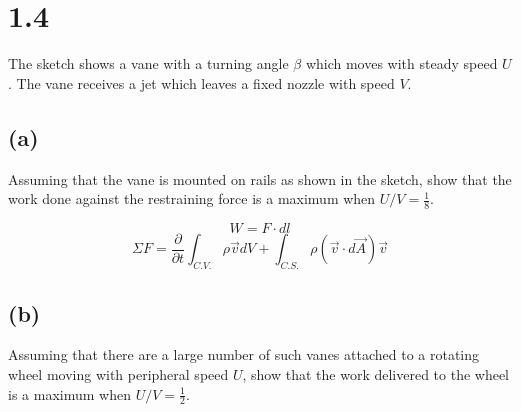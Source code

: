 \documentclass[preview,12pt]{article}
\begin{document}
\section*{1.4}
    The sketch shows a vane with a turning angle $\beta$ which moves with steady speed $U$.  The vane receives a jet which leaves a fixed nozzle with speed $V$.
    \subsection*{(a)} 
        Assuming that the vane is mounted on rails as shown in the sketch, show that the work done against the restraining force is a maximum when $U/V=\frac{1}{8}$.
        
        $$W=F\cdot dl$$
        $$\Sigma F=\frac{\partial}{\partial t}\int_{C.V.}\rho \vec{v}dV+\int_{C.S.}\rho(\vec{v}\cdot d\vec{A})\vec{v}$$
        
        
    
    \subsection*{(b)} 
        Assuming that there are a large number of such vanes attached to a rotating wheel moving with peripheral speed $U$, show that the work delivered to the wheel is a maximum when $U/V=\frac{1}{2}$.
\end{document}
